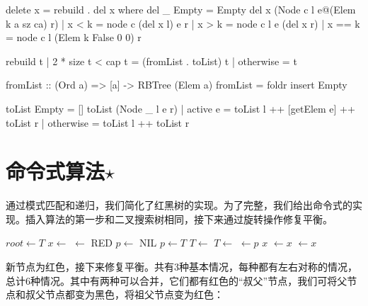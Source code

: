 \documentclass[b5paper]{ctexart}
\begin{document}
\begin{Answer}[ref = {ex:mark-rebuild}]
{\begin{Haskell}
delete x = rebuild . del x where
  del _ Empty = Empty
  del x (Node c l e@(Elem k a sz ca) r)
    | x < k = node c (del x l) e r
    | x > k = node c l e (del x r)
    | x == k = node c l (Elem k False 0 0) r

rebuild t | 2 * size t < cap t = (fromList . toList) t
          | otherwise = t

fromList :: (Ord a) => [a] -> RBTree (Elem a)
fromList = foldr insert Empty

toList Empty = []
toList (Node _ l e r) | active e = toList l ++ [getElem e] ++ toList r
                      | otherwise = toList l ++ toList r
\end{Haskell}
}
\end{Answer}

\section{命令式算法$\star$}

通过模式匹配和递归，我们简化了红黑树的实现。为了完整，我们给出命令式的实现。插入算法的第一步和二叉搜索树相同，接下来通过旋转操作修复平衡。

\begin{algorithmic}[1]
  \State $root \gets T$
  \State $x \gets$ 
  \State {} $\gets$ RED
  \State $p \gets$ NIL
    \State $p \gets T$
      \State $T \gets $ 
    \Else
      \State $T \gets $ 
    \EndIf
  \EndWhile
  \State {} $\gets p$
   
    \State \Return $x$
    \State {} $\gets x$
  \Else
    \State {} $\gets x$
  \EndIf
  \State \Return {}
\EndFunction
\end{algorithmic}

新节点为红色，接下来修复平衡。共有3种基本情况，每种都有左右对称的情况，总计6种情况。其中有两种可以合并，它们都有红色的“叔父”节点，我们可将父节点和叔父节点都变为黑色，将祖父节点变为红色：
\end{document}
